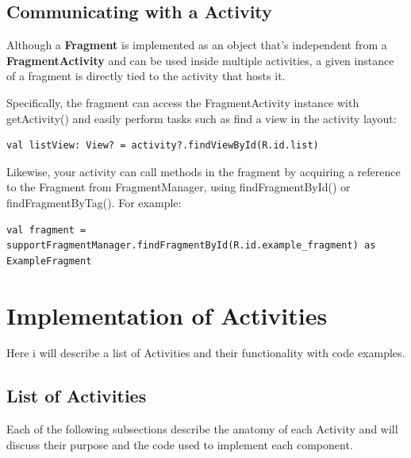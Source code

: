 \subsection{Communicating with a Activity}

Although a \textbf{Fragment} is implemented as an object that's independent from a \textbf{FragmentActivity} and can be used inside multiple activities, a given instance of a fragment is directly tied to the activity that hosts it.

Specifically, the fragment can access the FragmentActivity instance with getActivity() and easily perform tasks such as find a view in the activity layout:

\begin{verbatim}
val listView: View? = activity?.findViewById(R.id.list)
\end{verbatim}

Likewise, your activity can call methods in the fragment by acquiring a reference to the Fragment from FragmentManager, using findFragmentById() or findFragmentByTag(). For example:
\begin{verbatim}
val fragment = supportFragmentManager.findFragmentById(R.id.example_fragment) as ExampleFragment
\end{verbatim}

\section{Implementation of Activities}
Here i will  describe a list of Activities and their functionality with code examples.

\subsection{List of Activities}
Each of the following subsections describe the anatomy of each Activity and will discuss their purpose and the code used to implement each component.
